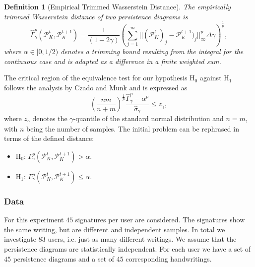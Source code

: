 \documentclass[journal]{IEEEtran}
\newtheorem{definition}{Definition}[section]
\begin{document}
\begin{definition}[Empirical Trimmed Wasserstein Distance]
The empirically trimmed Wasserstein distance of two persistence diagrams is
\[
  \hat{\Gamma}^p_\gamma(\mathcal{P}^t_K,\mathcal{P}^{t+1}_K) = \frac{1}{(1-2\gamma)} \left( \sum_{j=1}^{m} ||(\mathcal{P}^t_K)_j-\mathcal{P}^{t+1}_K)_j||^p_\infty \Delta \gamma \right)^\frac{1}{p},
\]
where $\alpha \in [0, 1/2)$ denotes a trimming bound resulting from the integral for the continuous case and is adapted as a difference in a finite weighted sum.
\end{definition}
The critical region of the equivalence test for our hypothesis $\text{H}_0$ against $\text{H}_1$ follows the analysis by Czado and Munk and is expressed as
\begin{equation}
\left(\frac{nm}{n+m}\right)^{\frac{1}{p}} \frac{\hat{\Gamma}^p_\gamma - \alpha^p}{\hat{\sigma}_\gamma} \leq z_\gamma,
\end{equation}
where $z_\gamma$ denotes the $\gamma$-quantile of the standard normal distribution and $n=m$, with $n$ being the number of samples. The initial problem can be rephrased in terms of the defined distance:
\begin{itemize}
  \item $\text{H}_0$: $\Gamma_\gamma^p (\mathcal{P}^t_K,\mathcal{P}^{t+1}_K) > \alpha$.
  \item $\text{H}_1$: $\Gamma_\gamma^p (\mathcal{P}^t_K,\mathcal{P}^{t+1}_K) \leq \alpha$.
\end{itemize}

\subsubsection{Data} For this experiment $45$ signatures per user are considered. The signatures show the same writing, but are different and independent samples. In total we investigate $83$ users, i.e. just as many different writings. We assume that the persistence diagrams are statistically independent. For each user we have a set of $45$ persistence diagrams and a set of $45$ corresponding handwritings.
\end{document}
